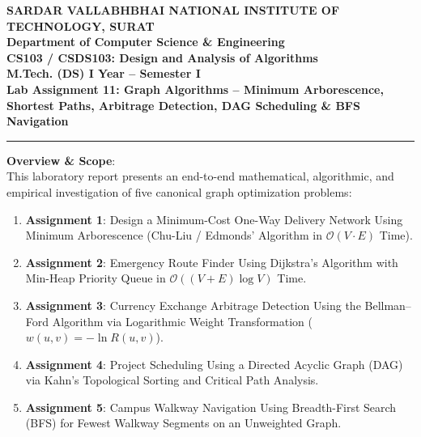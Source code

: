 \documentclass[12pt]{article}
\begin{document}
\begin{center}
\textbf{\Large SARDAR VALLABHBHAI NATIONAL INSTITUTE OF TECHNOLOGY, SURAT}\\[4pt]
\textbf{\large Department of Computer Science \& Engineering}\\[3pt]
\textbf{\large CS103 / CSDS103: Design and Analysis of Algorithms}\\[3pt]
\textbf{\large M.Tech. (DS) I Year -- Semester I}\\[4pt]
\textbf{\Large Lab Assignment 11: Graph Algorithms -- Minimum Arborescence, Shortest Paths, Arbitrage Detection, DAG Scheduling \& BFS Navigation}
\end{center}

\vspace{0.2cm}
\hrule
\vspace{0.4cm}

\textbf{Overview \& Scope}:\\
This laboratory report presents an end-to-end mathematical, algorithmic, and empirical investigation of five canonical graph optimization problems:
\begin{enumerate}
    \item \textbf{Assignment 1}: Design a Minimum-Cost One-Way Delivery Network Using Minimum Arborescence (Chu-Liu / Edmonds' Algorithm in $\mathcal{O}(V \cdot E)$ Time).
    \item \textbf{Assignment 2}: Emergency Route Finder Using Dijkstra's Algorithm with Min-Heap Priority Queue in $\mathcal{O}((V + E) \log V)$ Time.
    \item \textbf{Assignment 3}: Currency Exchange Arbitrage Detection Using the Bellman--Ford Algorithm via Logarithmic Weight Transformation ($w(u, v) = -\ln R(u, v)$).
    \item \textbf{Assignment 4}: Project Scheduling Using a Directed Acyclic Graph (DAG) via Kahn's Topological Sorting and Critical Path Analysis.
    \item \textbf{Assignment 5}: Campus Walkway Navigation Using Breadth-First Search (BFS) for Fewest Walkway Segments on an Unweighted Graph.
\end{enumerate}

\vspace{0.3cm}

\end{document}
